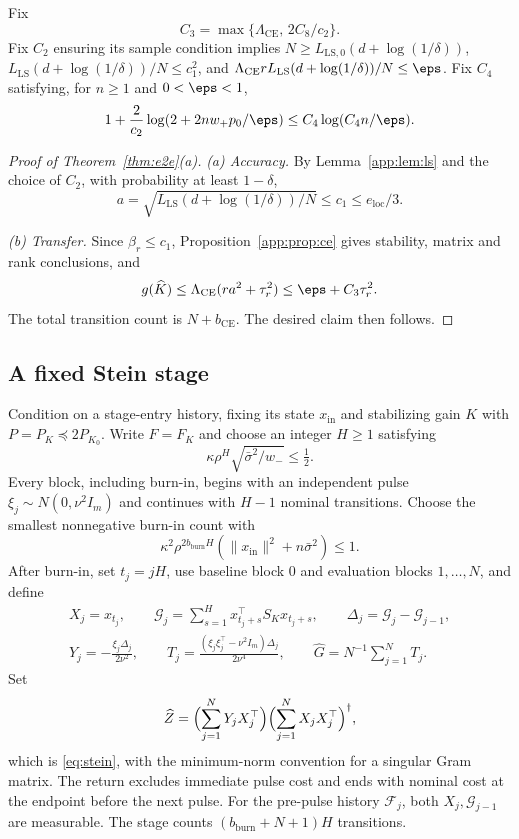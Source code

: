 Fix
\[
 C_3=\max\{\Lambda_{\mathrm{CE}},\,2C_8/c_2\}.
\]
Fix $C_2$ ensuring its sample condition implies
$N\ge L_{\mathrm{LS},0}(d+\log(1/\delta))$,
$L_{\mathrm{LS}}(d+\log(1/\delta))/N\le c_1^2$, and
$\Lambda_{\mathrm{CE}}rL_{\mathrm{LS}}(d+\log(1/\delta))/N\le\eps$.
Fix $C_4$ satisfying, for $n\ge1$ and $0<\eps<1$,
\[
 1+\frac2{c_2}\log(2+2nw_+p_0/\eps)
 \le C_4\log(C_4n/\eps).
\]

\begin{proof}[Proof of Theorem~\ref{thm:e2e}(a)]
\emph{(a) Accuracy.}
By Lemma~\ref{app:lem:ls} and the choice of $C_2$, with
probability at least $1-\delta$,
\[
 a=\sqrt{L_{\mathrm{LS}}(d+\log(1/\delta))/N}
 \le c_1\le e_{\mathrm{loc}}/3 .
\]

\emph{(b) Transfer.}
Since $\beta_r\le c_1$, Proposition~\ref{app:prop:ce}
gives stability, matrix and rank conclusions, and
\[
 g(\widehat K)\le\Lambda_{\mathrm{CE}}(ra^2+\tau_r^2)
 \le\eps+C_3\tau_r^2.
\]
The total transition count is $N+b_{\mathrm{CE}}$.
The desired claim then follows.
\end{proof}

\subsection{A fixed Stein stage}\label{app:stein}

Condition on a stage-entry history, fixing its state $x_{\mathrm{in}}$
and stabilizing gain $K$ with $P=P_K\preceq2P_{K_0}$.
Write $F=F_K$ and choose an integer $H\ge1$ satisfying
\begin{equation}\label{app:eq:horizon}
 \kappa\rho^H\sqrt{\bar\sigma^2/w_-}\le\tfrac12.
\end{equation}
Every block, including burn-in, begins with an independent pulse
$\xi_j\sim N(0,\nu^2I_m)$ and continues with $H-1$ nominal
transitions. Choose the smallest nonnegative burn-in count with
\begin{equation}\label{app:eq:burn}
 \kappa^2\rho^{2b_{\mathrm{burn}}H}
       (\|x_{\mathrm{in}}\|^2+n\bar\sigma^2)\le1.
\end{equation}
After burn-in, set $t_j=jH$, use baseline block $0$ and evaluation
blocks $1,\ldots,N$, and define
\[
 \begin{gathered}
 X_j=x_{t_j},\qquad
 \mathcal G_j=\sum_{s=1}^H x_{t_j+s}^\top S_Kx_{t_j+s},\qquad
 \Delta_j=\mathcal G_j-\mathcal G_{j-1},\\
 Y_j=-\frac{\xi_j\Delta_j}{2\nu^2},\qquad
 T_j=\frac{(\xi_j\xi_j^\top-\nu^2I_m)\Delta_j}{2\nu^4},\qquad
 \widehat G=N^{-1}\sum_{j=1}^NT_j .
 \end{gathered}
\]
Set
\[
 \widehat Z=\Bigl(\sum_{j=1}^NY_jX_j^\top\Bigr)
             \Bigl(\sum_{j=1}^NX_jX_j^\top\Bigr)^\dagger,
\]
which is \eqref{eq:stein}, with the minimum-norm convention for a
singular Gram matrix. The return excludes immediate pulse
cost and ends with nominal cost at the endpoint before the next pulse.
For the pre-pulse history $\mathcal F_j$, both
$X_j,\mathcal G_{j-1}$ are measurable.
The stage counts $(b_{\mathrm{burn}}+N+1)H$ transitions.

